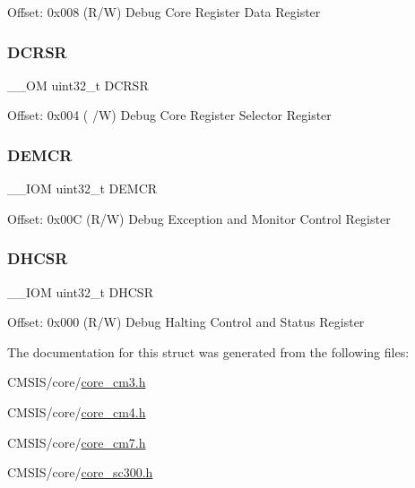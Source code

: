 Offset\+: 0x008 (R/W) Debug Core Register Data Register \mbox{\label{struct_core_debug___type_ab74a9ec90ad18e4f7a20362d362b754a}} 
\subsubsection{\texorpdfstring{D\+C\+R\+SR}{DCRSR}}
{\footnotesize\ttfamily \+\_\+\+\_\+\+OM uint32\+\_\+t D\+C\+R\+SR}

Offset\+: 0x004 ( /W) Debug Core Register Selector Register \mbox{\label{struct_core_debug___type_aa99de5f8c609f10c25ed51f57b2edd74}} 
\subsubsection{\texorpdfstring{D\+E\+M\+CR}{DEMCR}}
{\footnotesize\ttfamily \+\_\+\+\_\+\+I\+OM uint32\+\_\+t D\+E\+M\+CR}

Offset\+: 0x00C (R/W) Debug Exception and Monitor Control Register \mbox{\label{struct_core_debug___type_a94ca828091a9226ab6684fbf30e52909}} 
\subsubsection{\texorpdfstring{D\+H\+C\+SR}{DHCSR}}
{\footnotesize\ttfamily \+\_\+\+\_\+\+I\+OM uint32\+\_\+t D\+H\+C\+SR}

Offset\+: 0x000 (R/W) Debug Halting Control and Status Register 

The documentation for this struct was generated from the following files\+:\begin{DoxyCompactItemize}
\item 
C\+M\+S\+I\+S/core/\hyperlink{core__cm3_8h}{core\+\_\+cm3.\+h}\item 
C\+M\+S\+I\+S/core/\hyperlink{core__cm4_8h}{core\+\_\+cm4.\+h}\item 
C\+M\+S\+I\+S/core/\hyperlink{core__cm7_8h}{core\+\_\+cm7.\+h}\item 
C\+M\+S\+I\+S/core/\hyperlink{core__sc300_8h}{core\+\_\+sc300.\+h}\end{DoxyCompactItemize}
